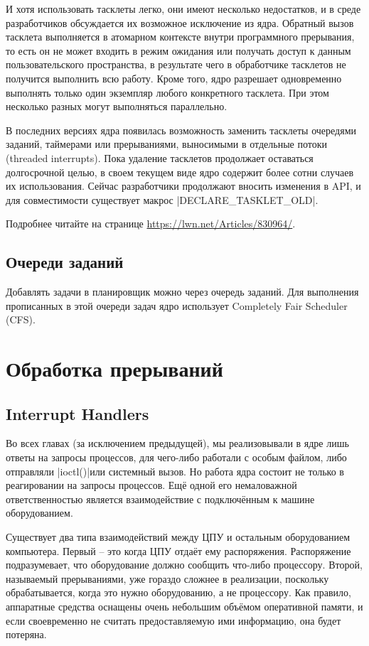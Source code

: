 \documentclass[10pt, oneside]{book}
\begin{document}
И хотя использовать тасклеты легко, они имеют несколько недостатков, и в среде разработчиков обсуждается их возможное исключение из ядра. Обратный вызов тасклета выполняется в атомарном контексте внутри программного прерывания, то есть он не может входить в режим ожидания или получать доступ к данным пользовательского пространства, в результате чего в обработчике тасклетов не получится выполнить всю работу. Кроме того, ядро разрешает одновременно выполнять только один экземпляр любого конкретного тасклета. При этом несколько разных могут выполняться параллельно.

В последних версиях ядра появилась возможность заменить тасклеты очередями заданий, таймерами или прерываниями, выносимыми в отдельные потоки (threaded
interrupts). Пока удаление тасклетов продолжает оставаться долгосрочной целью, в своем текущем виде ядро содержит более сотни случаев их использования. Сейчас разработчики продолжают вносить изменения в API, и для совместимости существует макрос \cpp|DECLARE_TASKLET_OLD|.

Подробнее читайте на странице \url{https://lwn.net/Articles/830964/}.

\subsection{Очереди заданий}
\label{sec:workqueue}
Добавлять задачи в планировщик можно через очередь заданий. Для выполнения прописанных в этой очереди задач ядро использует Completely Fair Scheduler (CFS).


\section{Обработка прерываний}
\label{sec:interrupt_handler}
\subsection{Interrupt Handlers}
\label{sec:irq}
Во всех главах (за исключением предыдущей), мы реализовывали в ядре лишь ответы на
запросы процессов, для чего-либо работали с особым файлом, либо отправляли \cpp|ioctl()|или системный вызов. Но работа ядра состоит не только в реагировании на запросы процессов. Ещё одной его немаловажной ответственностью является взаимодействие с подключённым к машине оборудованием.

Существует два типа взаимодействий между ЦПУ и остальным оборудованием компьютера. Первый – это когда ЦПУ отдаёт ему распоряжения. Распоряжение
подразумевает, что оборудование должно сообщить что-либо процессору. Второй, называемый прерываниями, уже гораздо сложнее в реализации, поскольку
обрабатывается, когда это нужно оборудованию, а не процессору. Как правило, аппаратные средства оснащены очень небольшим объёмом оперативной памяти, и если своевременно не считать предоставляемую ими информацию, она будет потеряна.
\end{document}
